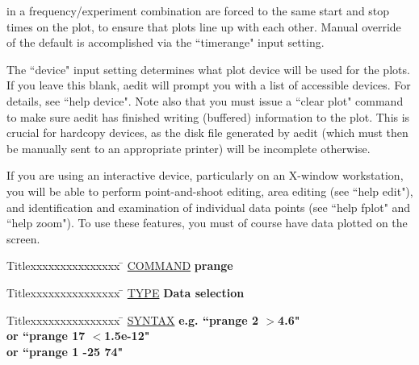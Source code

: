 \begin{list}{}{\setlength{\leftmargin}{0.5in}
     \setlength{\rightmargin}{0in}}
in a frequency/experiment combination are forced to the same
start and stop times on the plot, to ensure that plots line
up with each other.  Manual override of the default is
accomplished via the ``timerange" input setting.
\item
The ``device" input setting determines what plot device will be
used for the plots.  If you leave this blank, aedit will prompt
you with a list of accessible devices.  For details, see
``help device".  Note also that you must issue a ``clear plot"
command to make sure aedit has finished writing (buffered)
information to the plot.  This is crucial for hardcopy devices,
as the disk file generated by aedit (which must then be manually
sent to an appropriate printer) will be incomplete otherwise.
\item
If you are using an interactive device, particularly on an
X-window workstation, you will be able to perform point-and-shoot
editing, area editing (see ``help edit"), and identification
and examination of individual data points (see ``help fplot" and
``help zoom").  To use these features, you must of course have
data plotted on the screen.
\end{list}
\vspace{.2in}

\begin{tabbing}
Titlexxxxxxxxxxxxxxx \= \kill
\underline{COMMAND} \> {\bf 	prange} \\
\end{tabbing}

\begin{tabbing}
Titlexxxxxxxxxxxxxxx \= \kill
\underline{TYPE} \> {\bf 		Data selection} \\
\end{tabbing}

\begin{tabbing}
Titlexxxxxxxxxxxxxxx \= \kill
\underline{SYNTAX} \> {\bf 		e.g. ``prange 2 $>$4.6"} \\
\> {\bf 		or ``prange 17 $<$1.5e-12"} \\
\> {\bf 		or ``prange 1 -25 74"} \\
\end{tabbing}

